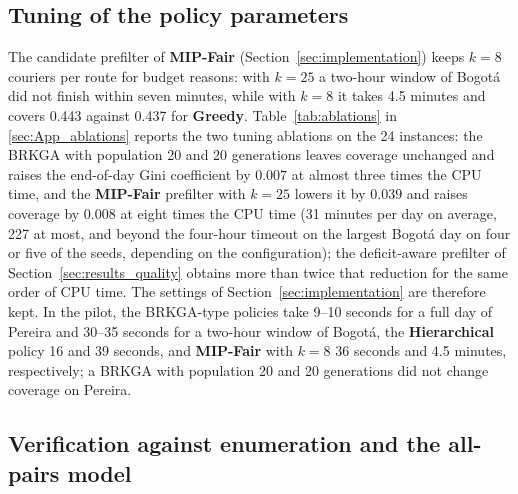\documentclass[a4paper,11pt,review,3p,authoryear]{elsarticle}
\begin{document}
\subsection{Tuning of the policy parameters}
\label{sec:app_tuning}

The candidate prefilter of \textbf{MIP-Fair} (Section~\ref{sec:implementation}) keeps $k = 8$ couriers per route for budget reasons: with $k = 25$ a two-hour window of Bogot\'a did not finish within seven minutes, while with $k = 8$ it takes 4.5 minutes and covers 0.443 against 0.437 for \textbf{Greedy}. Table~\ref{tab:ablations} in \ref{sec:App_ablations} reports the two tuning ablations on the 24 instances: the BRKGA with population 20 and 20 generations leaves coverage unchanged and raises the end-of-day Gini coefficient by $0.007$ at almost three times the CPU time, and the \textbf{MIP-Fair} prefilter with $k = 25$ lowers it by $0.039$ and raises coverage by $0.008$ at eight times the CPU time (31 minutes per day on average, 227 at most, and beyond the four-hour timeout on the largest Bogot\'a day on four or five of the seeds, depending on the configuration); the deficit-aware prefilter of Section~\ref{sec:results_quality} obtains more than twice that reduction for the same order of CPU time. The settings of Section~\ref{sec:implementation} are therefore kept. In the pilot, the BRKGA-type policies take 9--10 seconds for a full day of Pereira and 30--35 seconds for a two-hour window of Bogot\'a, the \textbf{Hierarchical} policy 16 and 39 seconds, and \textbf{MIP-Fair} with $k = 8$ 36 seconds and 4.5 minutes, respectively; a BRKGA with population 20 and 20 generations did not change coverage on Pereira.

\subsection{Verification against enumeration and the all-pairs model}
\label{sec:App_verification}
\end{document}
